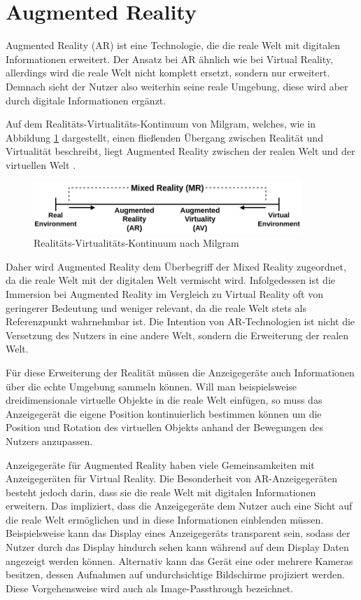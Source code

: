   \section{Augmented Reality}
  Augmented Reality (AR) ist eine Technologie, die die reale Welt mit digitalen Informationen erweitert.
  Der Ansatz bei AR ähnlich wie bei Virtual Reality, allerdings wird die reale Welt nicht komplett ersetzt, sondern nur erweitert.
  Demnach sieht der Nutzer also weiterhin seine reale Umgebung, diese wird aber durch digitale Informationen ergänzt.

  Auf dem Realitäts-Virtualitäts-Kontinuum von Milgram, welches, wie in Abbildung \ref{fig:rv-continuum} dargestellt, einen fließenden Übergang zwischen Realität und Virtualität beschreibt, liegt Augmented Reality zwischen der realen Welt und der virtuellen Welt \autocite[vgl.][S.9]{milgram1999}.

  \begin{figure}[H]
    \centering
    \includegraphics[width=0.9\textwidth]{images/RV-Continuum.png}
    \caption{Realitäts-Virtualitäts-Kontinuum nach Milgram}
    \label{fig:rv-continuum}
  \end{figure}

  Daher wird Augmented Reality dem Überbegriff der Mixed Reality zugeordnet, da die reale Welt mit der digitalen Welt vermischt wird.
  Infolgedessen ist die Immersion bei Augmented Reality im Vergleich zu Virtual Reality oft von geringerer Bedeutung und weniger relevant, da die reale Welt stets als Referenzpunkt wahrnehmbar ist.
  Die Intention von AR-Technologien ist nicht die Versetzung des Nutzers in eine andere Welt, sondern die Erweiterung der realen Welt.

  Für diese Erweiterung der Realität müssen die Anzeigegeräte auch Informationen über die echte Umgebung sammeln können.
  Will man beispielsweise dreidimensionale virtuelle Objekte in die reale Welt einfügen, so muss das Anzeigegerät die eigene Position kontinuierlich bestimmen können um die Position und Rotation des virtuellen Objekts anhand der Bewegungen des Nutzers anzupassen.

  Anzeigegeräte für Augmented Reality haben viele Gemeinsamkeiten mit Anzeigegeräten für Virtual Reality.
  Die Besonderheit von AR-Anzeigegeräten besteht jedoch darin, dass sie die reale Welt mit digitalen Informationen erweitern.
  Das impliziert, dass die Anzeigegeräte dem Nutzer auch eine Sicht auf die reale Welt ermöglichen und in diese Informationen einblenden müssen.
  Beispielsweise kann das Display eines Anzeigegeräts transparent sein, sodass der Nutzer durch das Display hindurch sehen kann während auf dem Display Daten angezeigt werden können.
  Alternativ kann das Gerät eine oder mehrere Kameras besitzen, dessen Aufnahmen auf undurchsichtige Bildschirme projiziert werden.
  Diese Vorgehensweise wird auch als Image-Passthrough bezeichnet.


